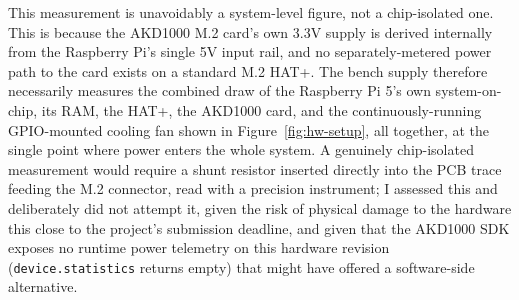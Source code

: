 This measurement is unavoidably a system-level figure, not a chip-isolated one. This is because the AKD1000 M.2 card's own 3.3V supply is derived internally from the Raspberry Pi's single 5V input rail, and no separately-metered power path to the card exists on a standard M.2 HAT+. The bench supply therefore necessarily measures the combined draw of the Raspberry Pi 5's own system-on-chip, its RAM, the HAT+, the AKD1000 card, and the continuously-running GPIO-mounted cooling fan shown in Figure~\ref{fig:hw-setup}, all together, at the single point where power enters the whole system. A genuinely chip-isolated measurement would require a shunt resistor inserted directly into the PCB trace feeding the M.2 connector, read with a precision instrument; I assessed this and deliberately did not attempt it, given the risk of physical damage to the hardware this close to the project's submission deadline, and given that the AKD1000 SDK exposes no runtime power telemetry on this hardware revision (\texttt{device.statistics} returns empty) that might have offered a software-side alternative. 